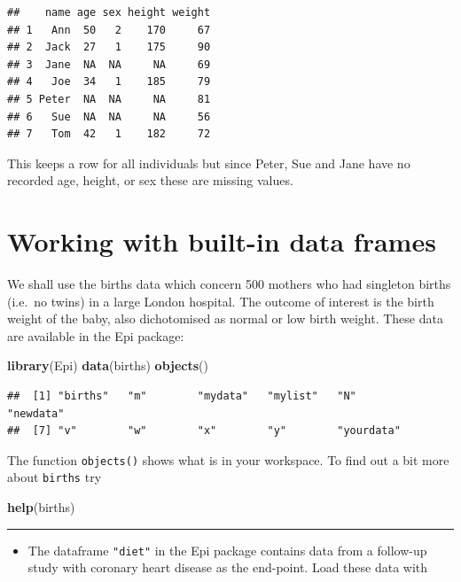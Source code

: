 \documentclass[
]{book}
\newenvironment{Shaded}{\begin{snugshade}}{\end{snugshade}}
\newcommand{\FunctionTok}[1]{\textcolor[rgb]{0.13,0.29,0.53}{\textbf{#1}}}
\newcommand{\NormalTok}[1]{#1}
\providecommand{\tightlist}{%
  \setlength{\itemsep}{0pt}\setlength{\parskip}{0pt}}
\begin{document}
\begin{verbatim}
##    name age sex height weight
## 1   Ann  50   2    170     67
## 2  Jack  27   1    175     90
## 3  Jane  NA  NA     NA     69
## 4   Joe  34   1    185     79
## 5 Peter  NA  NA     NA     81
## 6   Sue  NA  NA     NA     56
## 7   Tom  42   1    182     72
\end{verbatim}

This keeps a row for all individuals but since Peter, Sue and Jane
have no recorded age, height, or sex these are missing values.

\section{Working with built-in data frames}\label{working-with-built-in-data-frames}

We shall use the births data which concern 500 mothers who had
singleton births (i.e.~no twins) in a large London hospital. The
outcome of interest is the birth weight of the baby, also dichotomised
as normal or low birth weight. These data are available in the Epi
package:

\begin{Shaded}
\begin{Highlighting}[]
\FunctionTok{library}\NormalTok{(Epi)}
\FunctionTok{data}\NormalTok{(births)}
\FunctionTok{objects}\NormalTok{()}
\end{Highlighting}
\end{Shaded}

\begin{verbatim}
##  [1] "births"   "m"        "mydata"   "mylist"   "N"        "newdata" 
##  [7] "v"        "w"        "x"        "y"        "yourdata"
\end{verbatim}

The function \texttt{objects()} shows what is in your workspace. To
find out a bit more about \texttt{births} try

\begin{Shaded}
\begin{Highlighting}[]
\FunctionTok{help}\NormalTok{(births)}
\end{Highlighting}
\end{Shaded}

\begin{center}\rule{0.5\linewidth}{0.5pt}\end{center}

\begin{itemize}
\tightlist
\item
  The dataframe \texttt{"diet"} in the Epi package contains data from a follow-up study with
  coronary heart disease as the end-point. Load these data with
\end{itemize}
\end{document}
